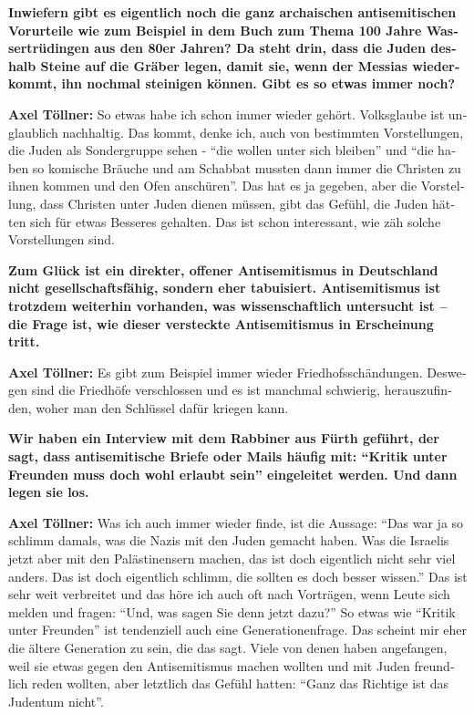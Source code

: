 \begin{otherlanguage}{ngerman}
\textbf{Inwiefern gibt es eigentlich noch die ganz archaischen antisemitischen Vorurteile wie zum Beispiel in dem Buch zum Thema 100 Jahre Wassertrüdingen aus den 80er Jahren? Da steht drin, dass die Juden deshalb Steine auf die Gräber legen, damit sie, wenn der Messias wiederkommt, ihn nochmal steinigen können. Gibt es so etwas immer noch?} 

\textbf{Axel Töllner:} So etwas habe ich schon immer wieder gehört. Volksglaube ist unglaublich nachhaltig. Das kommt, denke ich, auch von bestimmten Vorstellungen, die Juden als Sondergruppe sehen - "`die wollen unter sich bleiben"' und "`die haben so komische Bräuche und am Schabbat mussten dann immer die Christen zu ihnen kommen und den Ofen anschüren"'. Das hat es ja gegeben, aber die Vorstellung, dass Christen unter Juden dienen müssen, gibt das Gefühl, die Juden hätten sich für etwas Besseres gehalten. Das ist schon interessant, wie zäh solche Vorstellungen sind. 

\textbf{Zum Glück ist ein direkter, offener Antisemitismus in Deutschland nicht gesellschaftsfähig, sondern eher tabuisiert. Antisemitismus ist trotzdem weiterhin vorhanden, was wissenschaftlich untersucht ist – die Frage ist, wie dieser versteckte Antisemitismus in Erscheinung tritt.} 

\textbf{Axel Töllner:} Es gibt zum Beispiel immer wieder Friedhofsschändungen. Deswegen sind die Friedhöfe verschlossen und es ist manchmal schwierig, herauszufinden, woher man den Schlüssel dafür kriegen kann.  

\textbf{Wir haben ein Interview mit dem Rabbiner aus Fürth geführt, der sagt, dass antisemitische Briefe oder Mails häufig mit: "`Kritik unter Freunden muss doch wohl erlaubt sein"' eingeleitet werden. Und dann legen sie los.} 

\textbf{Axel Töllner:} Was ich auch immer wieder finde, ist die Aussage: "`Das war ja so schlimm damals, was die Nazis mit den Juden gemacht haben. Was die Israelis jetzt aber mit den Palästinensern machen, das ist doch eigentlich nicht sehr viel anders. Das ist doch eigentlich schlimm, die sollten es doch besser wissen."' Das ist sehr weit verbreitet und das höre ich auch oft nach Vorträgen, wenn Leute sich melden und fragen: "`Und, was sagen Sie denn jetzt dazu?"' So etwas wie "`Kritik unter Freunden"' ist tendenziell auch eine Generationenfrage. Das scheint mir eher die ältere Generation zu sein, die das sagt. Viele von denen haben angefangen, weil sie etwas gegen den Antisemitismus machen wollten und mit Juden freundlich reden wollten, aber letztlich das Gefühl hatten: "`Ganz das Richtige ist das Judentum nicht"'. 


\end{otherlanguage}
